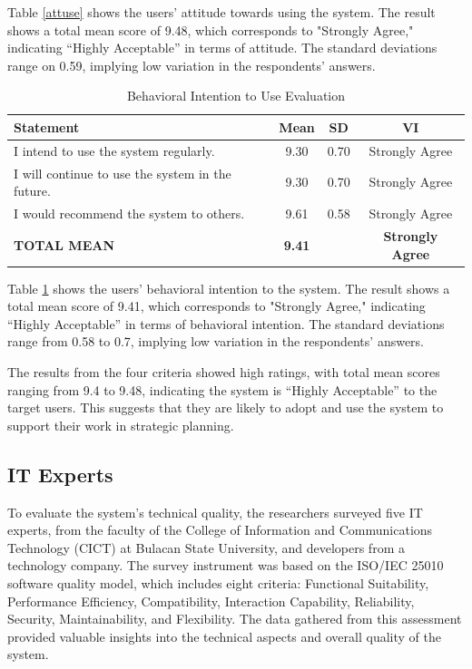 	Table \ref{attuse} shows the users’ attitude towards using the system. The result shows a total mean score of 9.48, which corresponds to "Strongly Agree," indicating “Highly Acceptable” in terms of attitude. The standard deviations range on 0.59, implying low variation in the respondents’ answers.
	
	
	\begin{table}[h!]
		\centering
		\caption{Behavioral Intention to Use Evaluation}
		\label{behint}
		\renewcommand{\arraystretch}{1.2}
		\begin{tabularx}{\linewidth}{|X|c|c|c|}
			\hline
			\textbf{Statement} & \textbf{Mean} & \textbf{SD} & \textbf{VI} \\ \hline
			I intend to use the system regularly.
			& 9.30 & 0.70 & Strongly Agree \\ \hline
			I will continue to use the system in the future.
			& 9.30 & 0.70 & Strongly Agree \\ \hline
			I would recommend the system to others.
			& 9.61 & 0.58 & Strongly Agree \\ \hline
			\textbf{TOTAL MEAN} & \textbf{9.41} & & \textbf{Strongly Agree} \\ \hline
		\end{tabularx}
	\end{table}
	
	Table \ref{behint} shows the users’ behavioral intention to the system. The result shows a total mean score of 9.41, which corresponds to "Strongly Agree," indicating “Highly Acceptable” in terms of behavioral intention. The standard deviations range from 0.58 to 0.7, implying low variation in the respondents’ answers.
	
	The results from the four criteria showed high ratings, with total mean scores ranging from 9.4 to 9.48, indicating the system is “Highly Acceptable” to the target users. This suggests that they are likely to adopt and use the system to support their work in strategic planning.
	
\subsection{IT Experts}
	To evaluate the system’s technical quality, the researchers surveyed five IT experts, from the faculty of the College of Information and Communications Technology (CICT) at Bulacan State University, and developers from a technology company. The survey instrument was based on the ISO/IEC 25010 software quality model, which includes eight criteria: Functional Suitability, Performance Efficiency, Compatibility, Interaction Capability, Reliability, Security, Maintainability, and Flexibility. The data gathered from this assessment provided valuable insights into the technical aspects and overall quality of the system.
	
